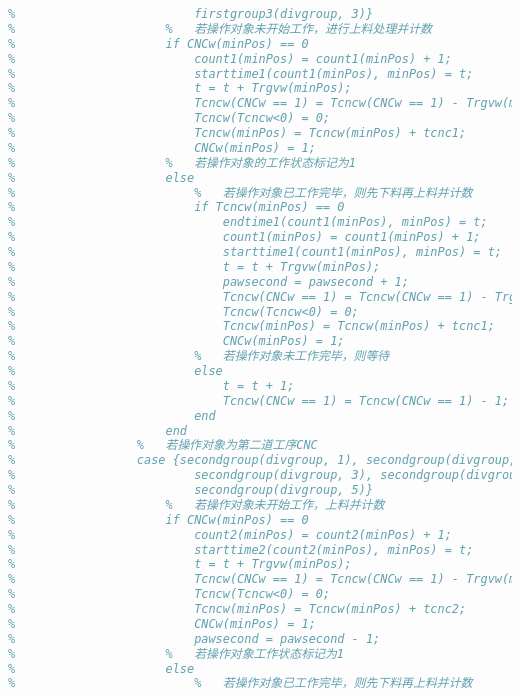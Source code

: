 \documentclass[no-math,withoutpreface,bwprint]{cumcmthesis} %
\numberwithin{equation}{section}
\numberwithin{figure}{section}
\numberwithin{table}{section}
\begin{document}
\begin{lstlisting}[language=matlab]
%                 case {firstgroup3(divgroup, 1), firstgroup3(divgroup, 2), ...
%                         firstgroup3(divgroup, 3)}
%                     %   若操作对象未开始工作，进行上料处理并计数
%                     if CNCw(minPos) == 0
%                         count1(minPos) = count1(minPos) + 1;
%                         starttime1(count1(minPos), minPos) = t;
%                         t = t + Trgvw(minPos);
%                         Tcncw(CNCw == 1) = Tcncw(CNCw == 1) - Trgvw(minPos);
%                         Tcncw(Tcncw<0) = 0;
%                         Tcncw(minPos) = Tcncw(minPos) + tcnc1;
%                         CNCw(minPos) = 1;
%                     %   若操作对象的工作状态标记为1
%                     else
%                         %   若操作对象已工作完毕，则先下料再上料并计数
%                         if Tcncw(minPos) == 0
%                             endtime1(count1(minPos), minPos) = t;
%                             count1(minPos) = count1(minPos) + 1;
%                             starttime1(count1(minPos), minPos) = t;
%                             t = t + Trgvw(minPos);
%                             pawsecond = pawsecond + 1;
%                             Tcncw(CNCw == 1) = Tcncw(CNCw == 1) - Trgvw(minPos);
%                             Tcncw(Tcncw<0) = 0;
%                             Tcncw(minPos) = Tcncw(minPos) + tcnc1;
%                             CNCw(minPos) = 1;
%                         %   若操作对象未工作完毕，则等待
%                         else
%                             t = t + 1;
%                             Tcncw(CNCw == 1) = Tcncw(CNCw == 1) - 1;
%                         end
%                     end
%                 %   若操作对象为第二道工序CNC
%                 case {secondgroup(divgroup, 1), secondgroup(divgroup, 2), ...
%                         secondgroup(divgroup, 3), secondgroup(divgroup, 4), ...
%                         secondgroup(divgroup, 5)}
%                     %   若操作对象未开始工作，上料并计数
%                     if CNCw(minPos) == 0
%                         count2(minPos) = count2(minPos) + 1;
%                         starttime2(count2(minPos), minPos) = t;
%                         t = t + Trgvw(minPos);
%                         Tcncw(CNCw == 1) = Tcncw(CNCw == 1) - Trgvw(minPos);
%                         Tcncw(Tcncw<0) = 0;
%                         Tcncw(minPos) = Tcncw(minPos) + tcnc2;
%                         CNCw(minPos) = 1;
%                         pawsecond = pawsecond - 1;
%                     %   若操作对象工作状态标记为1
%                     else
%                         %   若操作对象已工作完毕，则先下料再上料并计数

\end{lstlisting}
\end{document}
